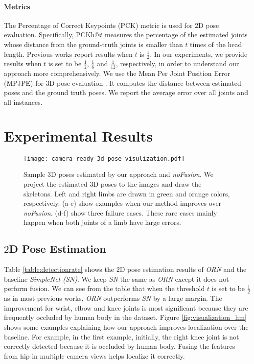 \documentclass[10pt,twocolumn,letterpaper]{article}
\begin{document}
\paragraph{Metrics} 
The Percentage of Correct Keypoints (PCK) metric is used for $2$D pose evaluation. Specifically, PCKh@$t$ measures the percentage of the estimated joints whose distance from the ground-truth joints is smaller than $t$ times of the head length. Previous works report results when $t$ is $\frac{1}{2}$. In our experiments, we provide results when $t$ is set to be $\frac{1}{2}$, $\frac{1}{6}$ and $\frac{1}{12}$, respectively, in order to understand our approach more comprehensively. We use the Mean Per Joint Position Error (MPJPE) for $3$D pose evaluation \cite{ionescu2014human3}. It computes the distance between estimated poses and the ground truth poses. We report the average error over all joints and all instances.








\section{Experimental Results}
\begin{figure*}[]
\centering
\texttt{[image: camera-ready-3d-pose-visulization.pdf]}
\caption{Sample $3$D poses estimated by our approach and \emph{noFusion}. We project the estimated $3$D poses to the images and draw the skeletons.
Left and right limbs are drawn in green and orange colors, respectively. (a-c) show examples when our method improves over \emph{noFusion}. 
(d-f) show three failure cases.
These rare cases mainly happen when both joints of a limb have large errors.}
\label{fig:visual}
\end{figure*}





\subsection{$2$D Pose Estimation}
Table \ref{table:detectionrate} shows the $2$D pose estimation results of \emph{ORN} and the baseline \emph{SimpleNet (SN)}. We keep \emph{SN} the same as \emph{ORN} except it does not perform fusion. We can see from the table that when the threshold $t$ is set to be $\frac{1}{2}$ as in most previous works, \emph{ORN} outperforms \emph{SN} by a large margin. The improvement for wrist, elbow and knee joints is most significant because they are frequently occluded by human body in the dataset. Figure \ref{fig:visualization_hm} shows some examples explaining how our approach improves localization  over the baseline. For example, in the first example, initially, the right knee joint is not correctly detected because it is occluded by human body. Fusing the features from hip in multiple camera views helps localize it correctly. 
\end{document}
